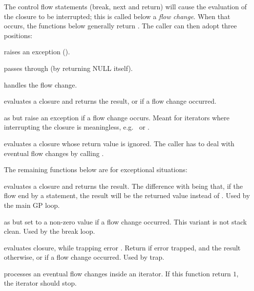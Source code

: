 The control flow statements (break, next and return) will cause the
evaluation of the closure to be interrupted; this is called below a
\emph{flow change}. When that occurs, the functions below generally
 return . The caller can then adopt three positions:

\item raises an exception ().

\item passes through (by returning NULL itself).

\item handles the flow change.

 evaluates a closure and returns the result,
or  if a flow change occurred.

 as  but raise
an exception if a flow change occurs. Meant for iterators where
interrupting the closure is meaningless, e.g.~ or .

 evaluates a closure whose return
value is ignored. The caller has to deal with eventual flow changes by
calling .

The remaining functions below are for exceptional situations:

 evaluates a closure and returns the result.
The difference with  being that, if the flow end by a
 statement, the result will be the returned value instead of
. Used by the main GP loop.

 as 
but set  to a non-zero value if a flow change occurred. This
variant is not stack clean. Used by the break loop.

 evaluates closure, while
trapping error . Return  if error trapped, and the
result otherwise, or  if a flow change occurred. Used by trap.



 processes an eventual flow changes inside an
iterator. If this function return $1$, the iterator should stop.

\label{se:pushlex}

